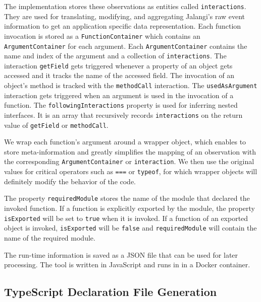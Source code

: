 \documentclass[a4paper,english,cleveref, autoref]{lipics-v2019}
\begin{document}
The implementation stores these observations as entities called
\texttt{interactions}. They are used for translating, modifying, and
aggregating Jalangi's raw event information to get an application
specific data representation. Each function invocation is stored as a \texttt{FunctionContainer} which contains an \texttt{ArgumentContainer} for each argument. Each \texttt{ArgumentContainer} contains the name and index of the argument and a collection of \texttt{interactions}. The interaction \texttt{getField} gets triggered whenever a property of an object gets accessed and it tracks the name of the accessed field. The invocation of an object's method is tracked with the \texttt{methodCall} interaction. The \texttt{usedAsArgument} interaction gets triggered when an argument is used in the invocation of a function. The \texttt{followingInteractions} property is used for inferring nested interfaces. It is an array that recursively records \texttt{interactions} on the return value of \texttt{getField} or \texttt{methodCall}.

We wrap each function's argument around a wrapper object, which enables to store meta-information and greatly simplifies the mapping of an observation with the corresponding \texttt{ArgumentContainer} or \texttt{interaction}. We then use the original values for critical operators such as \texttt{===} or \texttt{typeof}, for which wrapper objects will definitely modify the behavior of the code.

The property \texttt{requiredModule} stores the name of the module that declared the invoked function. If a function is explicitly exported by the module, the property \texttt{isExported} will be set to \texttt{true} when it is invoked. If a function of an exported object is invoked, \texttt{isExported} will be \texttt{false} and \texttt{requiredModule} will contain the name of the required module.

The run-time information is saved as a JSON file that can be used for later processing. The tool is written in JavaScript and runs in \NodeJS{} in a Docker container. 

\subsection{TypeScript Declaration File Generation}
\label{sec:typescr-decl-file}
\end{document}
